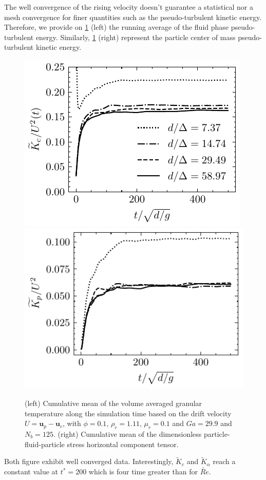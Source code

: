 The well convergence of the rising velocity doesn't guarantee a statistical nor a mesh convergence for finer quantities such as the pseudo-turbulent kinetic energy. 
Therefore, we provide on \ref{fig:UpUp} (left) the running average of the fluid phase pseudo-turbulent energy. 
Similarly, \ref{fig:UpUp} (right) represent the particle center of mass pseudo-turbulent kinetic energy. 
\begin{figure}[h!]
    \centering
    \includegraphics[height = 0.3\textwidth]{image/VALIDATION2.0/fCA/Tcum.pdf}
    \includegraphics[height = 0.3\textwidth]{image/VALIDATION2.0/fPA/Tcum.pdf}
    \caption{(left) Cumulative mean of the volume averaged granular temperature along the simulation time based on the drift velocity $U = \textbf{u}_p - \textbf{u}_c$, with $\phi = 0.1$, $\rho_r = 1.11$, $ \mu_r =0.1$ and $Ga = 29.9$ and $N_b = 125$.
    (right) Cumulative mean of the dimensionless particle-fluid-particle stress horizontal component tensor. }
    \label{fig:UpUp}
\end{figure}
Both figure exhibit well converged data. 
Interestingly, $\widetilde{K}_c$ and $\widetilde{K}_\alpha$ reach a constant value at $t^* = 200$ which is four time greater than for $\widetilde{Re}$.


